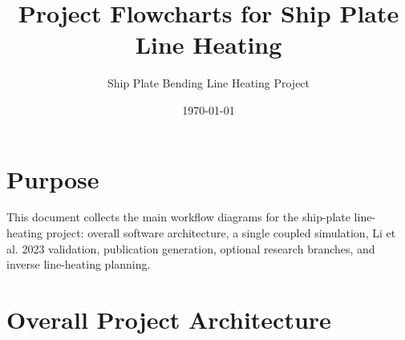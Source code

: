 \documentclass[11pt,a4paper]{article}
\title{Project Flowcharts for Ship Plate Line Heating}
\author{Ship Plate Bending Line Heating Project}
\date{\today}
\begin{document}
\maketitle

\section*{Purpose}
This document collects the main workflow diagrams for the ship-plate line-heating project: overall software architecture, a single coupled simulation, Li et al. 2023 validation, publication generation, optional research branches, and inverse line-heating planning.

\section{Overall Project Architecture}
\end{document}
